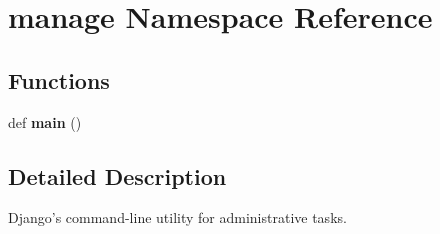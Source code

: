 \hypertarget{namespacemanage}{}\section{manage Namespace Reference}
\label{namespacemanage}
\subsection*{Functions}
\begin{DoxyCompactItemize}
\item 
\mbox{\label{namespacemanage_afd5b00260cc364aa5bde07e227c6ea78}} 
def {\bfseries main} ()
\end{DoxyCompactItemize}


\subsection{Detailed Description}
\begin{DoxyVerb}Django's command-line utility for administrative tasks.\end{DoxyVerb}
 
